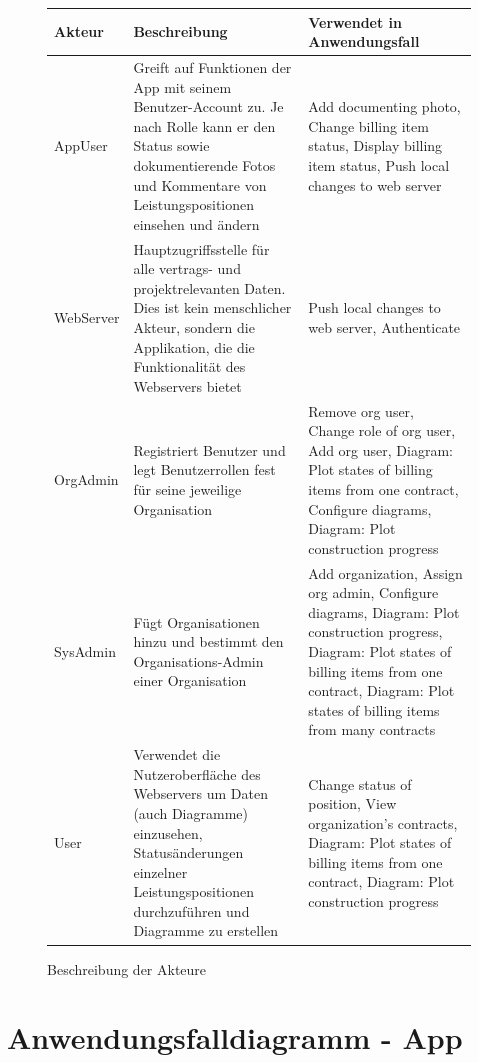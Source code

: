 \begin{figure}[h]
	\centering
	\begin{tabularx}{\textwidth}{ p{} | X | X }
		\textbf{Akteur} & \textbf{Beschreibung} & \textbf{Verwendet in Anwendungsfall} \\ \hline
		AppUser & Greift auf Funktionen der App mit seinem Benutzer-Account zu. Je nach Rolle kann er den Status sowie dokumentierende Fotos und Kommentare von Leistungspositionen einsehen und \"andern &  Add documenting photo,  Change billing item status,  Display billing item status, Push local changes to web server  \\ \hline
		WebServer & Hauptzugriffsstelle f\"ur alle vertrags- und projektrelevanten Daten. Dies ist kein menschlicher Akteur, sondern die Applikation, die die Funktionalität des Webservers bietet &  Push local changes to web server,  Authenticate\\ \hline
		OrgAdmin & Registriert Benutzer und legt Benutzerrollen fest für seine jeweilige Organisation & Remove org user,  Change role of org user,  Add org user, Diagram: Plot states of billing items from one contract,  Configure diagrams,  Diagram: Plot construction progress\\ \hline
		SysAdmin & F\"ugt Organisationen hinzu und bestimmt den Organisations-Admin einer Organisation & Add organization, Assign org admin,  Configure diagrams, Diagram: Plot construction progress,  Diagram: Plot states of billing items from one contract,  Diagram: Plot states of billing items from many contracts \\ \hline
		User & Verwendet die Nutzeroberfl\"ache des Webservers um Daten (auch Diagramme) einzusehen,  Status\"anderungen einzelner Leistungspositionen durchzuf\"uhren und Diagramme zu erstellen & Change status of position,  View organization's contracts, Diagram: Plot states of billing items from one contract,  Diagram: Plot construction progress 
	\end{tabularx}
	
	\caption{Beschreibung der Akteure}
	\label{fig:akteur-tabelle}
\end{figure}

\newpage

\section{Anwendungsfalldiagramm - App}

